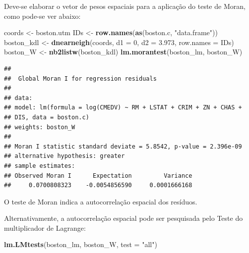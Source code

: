 \documentclass[12pt,]{article}
\newenvironment{Shaded}{\begin{snugshade}}{\end{snugshade}}
\newcommand{\KeywordTok}[1]{\textcolor[rgb]{0.13,0.29,0.53}{\textbf{#1}}}
\newcommand{\DataTypeTok}[1]{\textcolor[rgb]{0.13,0.29,0.53}{#1}}
\newcommand{\DecValTok}[1]{\textcolor[rgb]{0.00,0.00,0.81}{#1}}
\newcommand{\FloatTok}[1]{\textcolor[rgb]{0.00,0.00,0.81}{#1}}
\newcommand{\StringTok}[1]{\textcolor[rgb]{0.31,0.60,0.02}{#1}}
\newcommand{\NormalTok}[1]{#1}
\begin{document}
Deve-se elaborar o vetor de pesos espaciais para a aplicação do teste de
Moran, como pode-se ver abaixo:

\begin{Shaded}
\begin{Highlighting}[]
\NormalTok{coords <-}\StringTok{ }\NormalTok{boston.utm}
\NormalTok{IDs <-}\StringTok{ }\KeywordTok{row.names}\NormalTok{(}\KeywordTok{as}\NormalTok{(boston.c, }\StringTok{"data.frame"}\NormalTok{))}
\NormalTok{boston_kdl <-}\StringTok{ }\KeywordTok{dnearneigh}\NormalTok{(coords, }\DataTypeTok{d1 =} \DecValTok{0}\NormalTok{, }\DataTypeTok{d2 =} \FloatTok{3.973}\NormalTok{, }\DataTypeTok{row.names =}\NormalTok{ IDs)}
\NormalTok{boston_W <-}\StringTok{ }\KeywordTok{nb2listw}\NormalTok{(boston_kdl)}
\KeywordTok{lm.morantest}\NormalTok{(boston_lm, boston_W)}
\end{Highlighting}
\end{Shaded}

\begin{verbatim}
## 
##  Global Moran I for regression residuals
## 
## data:  
## model: lm(formula = log(CMEDV) ~ RM + LSTAT + CRIM + ZN + CHAS +
## DIS, data = boston.c)
## weights: boston_W
## 
## Moran I statistic standard deviate = 5.8542, p-value = 2.396e-09
## alternative hypothesis: greater
## sample estimates:
## Observed Moran I      Expectation         Variance 
##     0.0700808323    -0.0054856590     0.0001666168
\end{verbatim}

O teste de Moran indica a autocorrelação espacial dos resíduos.

Alternativamente, a autocorrelação espacial pode ser pesquisada pelo
Teste do multiplicador de Lagrange:

\begin{Shaded}
\begin{Highlighting}[]
\KeywordTok{lm.LMtests}\NormalTok{(boston_lm, boston_W, }\DataTypeTok{test =} \StringTok{"all"}\NormalTok{)}
\end{Highlighting}
\end{Shaded}
\end{document}
